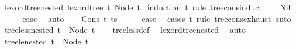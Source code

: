 \begin{isabellebody}
\endisatagproof
{\isafoldproof}%
%
\isadelimproof
\isanewline
%
\endisadelimproof
\isanewline
{}\isamarkupfalse%
\ lexord{\isacharunderscore}{\kern0pt}tree{\isacharunderscore}{\kern0pt}nested{\isacharcolon}{\kern0pt}\ {\isachardoublequoteopen}lexord{\isacharunderscore}{\kern0pt}tree\ t\ {\isacharparenleft}{\kern0pt}Node\ {\isacharbrackleft}{\kern0pt}t{\isacharbrackright}{\kern0pt}{\isacharparenright}{\kern0pt}{\isachardoublequoteclose}\isanewline
%
\isadelimproof
%
\endisadelimproof
%
\isatagproof
{}\isamarkupfalse%
\ {\isacharparenleft}{\kern0pt}induction\ t\ rule{\isacharcolon}{\kern0pt}\ tree{\isacharunderscore}{\kern0pt}cons{\isacharunderscore}{\kern0pt}induct{\isacharparenright}{\kern0pt}\isanewline
\ \ \isamarkupfalse%
\ Nil\isanewline
\ \ \isamarkupfalse%
\ \isamarkupfalse%
\ {\isacharquery}{\kern0pt}case\ \isamarkupfalse%
\ auto\isanewline
{}\isamarkupfalse%
\isanewline
\ \ \isamarkupfalse%
\ {\isacharparenleft}{\kern0pt}Cons\ t\ ts{\isacharparenright}{\kern0pt}\isanewline
\ \ \isamarkupfalse%
\ \isamarkupfalse%
\ {\isacharquery}{\kern0pt}case\ \isamarkupfalse%
\ {\isacharparenleft}{\kern0pt}cases\ t\ rule{\isacharcolon}{\kern0pt}\ tree{\isacharunderscore}{\kern0pt}cons{\isacharunderscore}{\kern0pt}exhaust{\isacharparenright}{\kern0pt}\ auto\isanewline
{}\isamarkupfalse%
%
\endisatagproof
{\isafoldproof}%
%
\isadelimproof
\isanewline
%
\endisadelimproof
\isanewline
{}\isamarkupfalse%
\ tree{\isacharunderscore}{\kern0pt}less{\isacharunderscore}{\kern0pt}nested{\isacharcolon}{\kern0pt}\ {\isachardoublequoteopen}t\ {\isacharless}{\kern0pt}\ Node\ {\isacharbrackleft}{\kern0pt}t{\isacharbrackright}{\kern0pt}{\isachardoublequoteclose}\isanewline
%
\isadelimproof
\ \ %
\endisadelimproof
%
\isatagproof
{}\isamarkupfalse%
\ tree{\isacharunderscore}{\kern0pt}less{\isacharunderscore}{\kern0pt}def\ \isamarkupfalse%
\ lexord{\isacharunderscore}{\kern0pt}tree{\isacharunderscore}{\kern0pt}nested\ \isamarkupfalse%
\ auto%
\endisatagproof
{\isafoldproof}%
%
\isadelimproof
\isanewline
%
\endisadelimproof
\isanewline
{}\isamarkupfalse%
\ tree{\isacharunderscore}{\kern0pt}le{\isacharunderscore}{\kern0pt}nested{\isacharcolon}{\kern0pt}\ {\isachardoublequoteopen}t\ {\isasymle}\ Node\ {\isacharbrackleft}{\kern0pt}t{\isacharbrackright}{\kern0pt}{\isachardoublequoteclose}\isanewline
%
\isadelimproof

\end{isabellebody}
